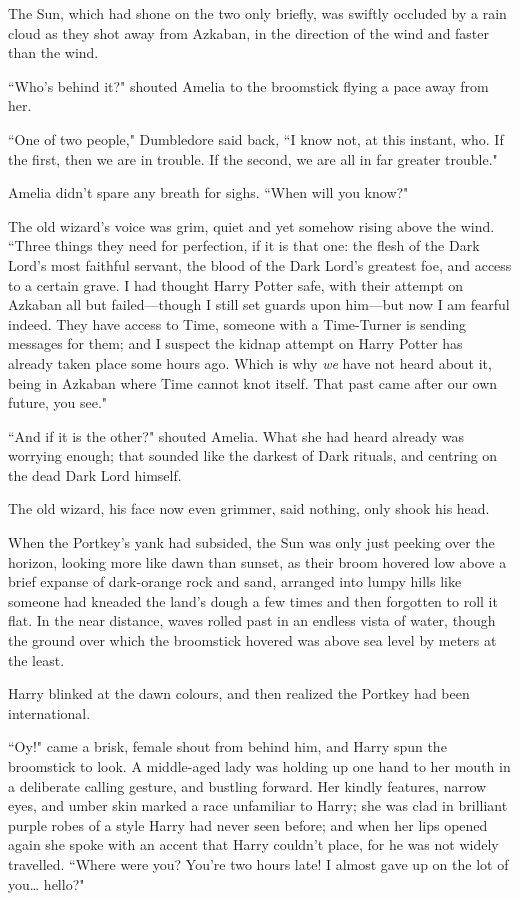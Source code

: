 \later

The Sun, which had shone on the two only briefly, was swiftly occluded by a rain cloud as they shot away from Azkaban, in the direction of the wind and faster than the wind.

``Who's behind it?" shouted Amelia to the broomstick flying a pace away from her.

``One of two people," Dumbledore said back, ``I know not, at this instant, who. If the first, then we are in trouble. If the second, we are all in far greater trouble."

Amelia didn't spare any breath for sighs. ``When will you know?"

The old wizard's voice was grim, quiet and yet somehow rising above the wind. ``Three things they need for perfection, if it is that one: the flesh of the Dark Lord's most faithful servant, the blood of the Dark Lord's greatest foe, and access to a certain grave. I had thought Harry Potter safe, with their attempt on Azkaban all but failed—though I still set guards upon him—but now I am fearful indeed. They have access to Time, someone with a Time-Turner is sending messages for them; and I suspect the kidnap attempt on Harry Potter has already taken place some hours ago. Which is why \emph{we} have not heard about it, being in Azkaban where Time cannot knot itself. That past came after our own future, you see."

``And if it is the other?" shouted Amelia. What she had heard already was worrying enough; that sounded like the darkest of Dark rituals, and centring on the dead Dark Lord himself.

The old wizard, his face now even grimmer, said nothing, only shook his head.

\later

When the Portkey's yank had subsided, the Sun was only just peeking over the horizon, looking more like dawn than sunset, as their broom hovered low above a brief expanse of dark-orange rock and sand, arranged into lumpy hills like someone had kneaded the land's dough a few times and then forgotten to roll it flat. In the near distance, waves rolled past in an endless vista of water, though the ground over which the broomstick hovered was above sea level by meters at the least.

Harry blinked at the dawn colours, and then realized the Portkey had been international.

``Oy!" came a brisk, female shout from behind him, and Harry spun the broomstick to look. A middle-aged lady was holding up one hand to her mouth in a deliberate calling gesture, and bustling forward. Her kindly features, narrow eyes, and umber skin marked a race unfamiliar to Harry; she was clad in brilliant purple robes of a style Harry had never seen before; and when her lips opened again she spoke with an accent that Harry couldn't place, for he was not widely travelled. ``Where were you? You're two hours late! I almost gave up on the lot of you{\ldots} hello?"

